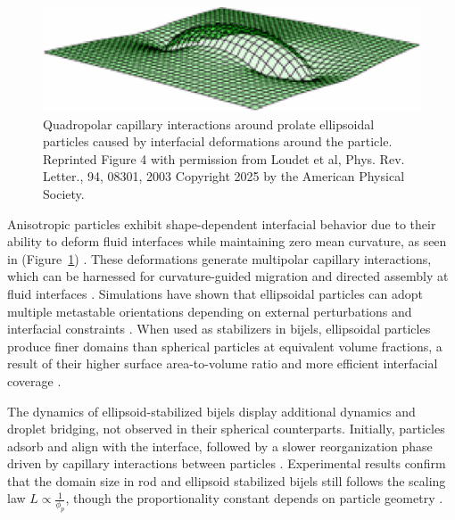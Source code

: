 \begin{figure}
    \centering
    \includegraphics[scale = 0.5]{figures/literature_review/interfacial_curvature.png}
    \caption{Quadropolar capillary interactions around prolate ellipsoidal particles caused by interfacial deformations 
             around the particle. \cite{loudet_capillary_2005} Reprinted Figure 4 with permission from
             Loudet et al, Phys. Rev. Letter., 94, 08301, 2003 Copyright 2025 by the American Physical Society.}
    \label{fig:anisotropic_particle_interface}
\end{figure}


Anisotropic particles exhibit shape-dependent interfacial behavior due to their ability to deform fluid interfaces while maintaining zero mean curvature, as seen in 
(Figure~\ref{fig:anisotropic_particle_interface}) \cite{loudet_capillary_2005, cheng_shape-anisotropic_2013}. These deformations generate multipolar capillary interactions, which can be harnessed 
for curvature-guided migration and directed assembly at fluid interfaces \cite{cavallaro_curvature-driven_2011, read_dimerization_2020, sharifi-mood_curvature_2015}. Simulations have shown that 
ellipsoidal particles can adopt multiple metastable orientations depending on external perturbations and interfacial constraints \cite{gunther_lattice_2013}. When used as stabilizers in bijels, 
ellipsoidal particles produce finer domains than spherical particles at equivalent volume fractions, a result of their higher surface area-to-volume ratio and more efficient interfacial coverage 
\cite{gunther_timescales_2014}.

The dynamics of ellipsoid-stabilized bijels display additional dynamics and droplet bridging, not observed in their spherical counterparts. \cite{gunther_timescales_2014, witt_bijel_2013} Initially, particles adsorb and align with the interface, 
followed by a slower reorganization phase driven by capillary interactions between particles \cite{gunther_timescales_2014}. Experimental results confirm that the domain size in rod and ellipsoid stabilized 
bijels still follows the scaling law $L \propto \frac{1}{\phi_p}$, though the proportionality constant depends on particle geometry \cite{hijnen_bijels_2015, madivala_exploiting_2009, daware_emulsions_2015}.

